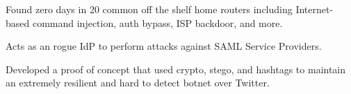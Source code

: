 \documentclass[10pt,a4paper]{altacv}
\begin{document}

Found zero days in 20 common off the shelf home routers including Internet-based command injection, auth bypass, ISP backdoor, and more.

\divider

Acts as an rogue IdP to perform attacks against SAML Service Providers.

\divider

Developed a proof of concept that used crypto, stego, and hashtags to
maintain an extremely resilient and hard to detect botnet over Twitter.

\medskip
\end{document}
